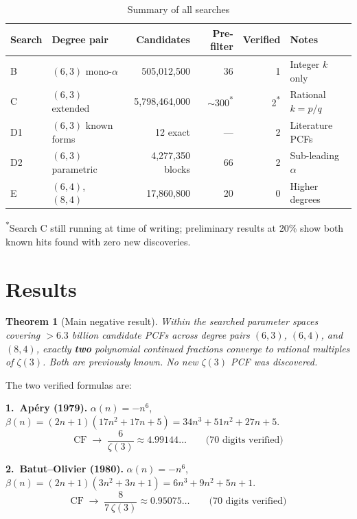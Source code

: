 \documentclass[11pt]{article}
\newtheorem{theorem}{Theorem}
\begin{document}
\begin{table}[h]
\centering
\caption{Summary of all searches}
\smallskip
\begin{tabular}{@{}llrrrl@{}}
\toprule
Search & Degree pair & Candidates & Pre-filter & Verified & Notes \\
\midrule
B & $(6,3)$ mono-$\alpha$ & 505{,}012{,}500 & 36 & 1 & Integer $k$ only \\
C & $(6,3)$ extended & 5{,}798{,}464{,}000 & $\sim 300$\textsuperscript{*} & 2\textsuperscript{*} & Rational $k=p/q$ \\
D1 & $(6,3)$ known forms & 12 exact & --- & 2 & Literature PCFs \\
D2 & $(6,3)$ parametric & 4{,}277{,}350 blocks & 66 & 2 & Sub-leading $\alpha$ \\
E & $(6,4)$, $(8,4)$ & 17{,}860{,}800 & 20 & 0 & Higher degrees \\
\bottomrule
\end{tabular}

\smallskip
\textsuperscript{*}Search C still running at time of writing; preliminary results at 20\% show both known hits found with zero new discoveries.
\end{table}

\section{Results}

\begin{theorem}[Main negative result]
Within the searched parameter spaces covering $>6.3$ billion candidate PCFs
across degree pairs $(6,3)$, $(6,4)$, and $(8,4)$, exactly \textbf{two}
polynomial continued fractions converge to rational multiples of $\zeta(3)$.
Both are previously known.  No new $\zeta(3)$ PCF was discovered.
\end{theorem}

The two verified formulas are:

\medskip
\noindent\textbf{1.\ Ap\'ery (1979).}\quad
$\alpha(n) = -n^6$, \;
$\beta(n) = (2n+1)(17n^2+17n+5) = 34n^3+51n^2+27n+5$.
\[
\text{CF} \;\to\; \frac{6}{\zeta(3)} \approx 4.99144\ldots
\qquad\text{(70 digits verified)}
\]

\noindent\textbf{2.\ Batut--Olivier (1980).}\quad
$\alpha(n) = -n^6$, \;
$\beta(n) = (2n+1)(3n^2+3n+1) = 6n^3+9n^2+5n+1$.
\[
\text{CF} \;\to\; \frac{8}{7\,\zeta(3)} \approx 0.95075\ldots
\qquad\text{(70 digits verified)}
\]
\end{document}
